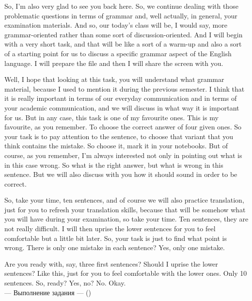 \documentclass[main.tex]{subfiles}
\begin{document}
\setcounter{section}{8}


So, I'm also very glad to see you back here.
So, we continue dealing with those problematic questions in terms of grammar and, well actually, in general, your examination materials.
And so, our today's class will be, I would say, more grammar-oriented rather than some sort of discussion-oriented.
And I will begin with a very short task, and that will be like a sort of a warm-up and also a sort of a starting point for us to discuss a specific grammar aspect of the English language.
I will prepare the file and then I will share the screen with you.


Well, I hope that looking at this task, you will understand what grammar material, because I used to mention it during the previous semester.
I think that it is really important in terms of our everyday communication and in terms of your academic communication, and we will discuss in what way it is important for us.
But in any case, this task is one of my favourite ones.
This is my favourite, as you remember.
To choose the correct answer of four given ones.
So your task is to pay attention to the sentence, to choose that variant that you think contains the mistake.
So choose it, mark it in your notebooks.
But of course, as you remember, I'm always interested not only in pointing out what is in this case wrong.
So what is the right answer, but what is wrong in this sentence.
But we will also discuss with you how it should sound in order to be correct.

So, take your time, ten sentences, and of course we will also practice translation, just for you to refresh your translation skills, because that will be somehow what you will have during your examination, so take your time.
Ten sentences, they are not really difficult.
I will then uprise the lower sentences for you to feel comfortable but a little bit later.
So, your task is just to find what point is wrong.
There is only one mistake in each sentence?
Yes, only one mistake.

Are you ready with, say, three first sentences?
Should I uprise the lower sentences?
Like this, just for you to feel comfortable with the lower ones.
Only 10 sentences.
So, ready? Yes, no? No.
Okay.
\\

\hypertarget{ltask:2024-03-13}{--- Выполнение задания ---} (\hyperref[task:2024-03-13]{\color{blue}{перейти к тексту задания}})
\\
\end{document}
